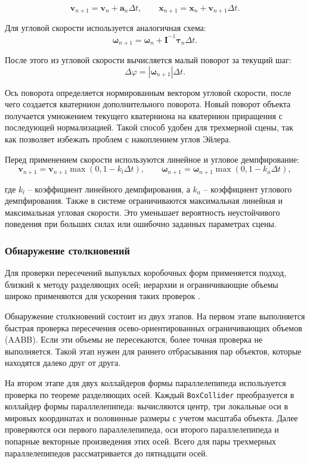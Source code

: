 \[
\mathbf{v}_{n+1}=\mathbf{v}_{n}+\mathbf{a}_{n}\Delta t,
\qquad
\mathbf{x}_{n+1}=\mathbf{x}_{n}+\mathbf{v}_{n+1}\Delta t.
\]

Для угловой скорости используется аналогичная схема:
\[
\boldsymbol{\omega}_{n+1}=\boldsymbol{\omega}_{n}+\mathbf{I}^{-1}\boldsymbol{\tau}_{n}\Delta t.
\]

После этого из угловой скорости вычисляется малый поворот за текущий шаг:
\[
\Delta \varphi = |\boldsymbol{\omega}_{n+1}|\Delta t.
\]

Ось поворота определяется нормированным вектором угловой скорости, после чего
создается кватернион дополнительного поворота. Новый поворот объекта получается
умножением текущего кватерниона на кватернион приращения с последующей
нормализацией. Такой способ удобен для трехмерной сцены, так как позволяет
избежать проблем с накоплением углов Эйлера.

Перед применением скорости используются линейное и угловое демпфирование:
\[
\mathbf{v}_{n+1}=\mathbf{v}_{n+1}\max(0,1-k_l\Delta t),
\qquad
\boldsymbol{\omega}_{n+1}=\boldsymbol{\omega}_{n+1}\max(0,1-k_a\Delta t),
\]

где \(k_l\) -- коэффициент линейного демпфирования, а \(k_a\) -- коэффициент
углового демпфирования. Также в системе ограничиваются максимальная линейная
и максимальная угловая скорости. Это уменьшает вероятность неустойчивого
поведения при больших силах или ошибочно заданных параметрах сцены.

\subsubsection{Обнаружение столкновений}

Для проверки пересечений выпуклых коробочных форм применяется подход, близкий
к методу разделяющих осей; иерархии и ограничивающие объемы широко применяются
для ускорения таких проверок \cite{gottschalk-obbtree}.

Обнаружение столкновений состоит из двух этапов. На первом этапе выполняется
быстрая проверка пересечения осево-ориентированных ограничивающих объемов
(AABB). Если эти объемы не пересекаются, более точная проверка не выполняется.
Такой этап нужен для раннего отбрасывания пар объектов, которые находятся далеко
друг от друга.

На втором этапе для двух коллайдеров формы параллелепипеда используется проверка
по теореме разделяющих осей. Каждый \texttt{BoxCollider} преобразуется в
коллайдер формы параллелепипеда: вычисляются центр, три
локальные оси в мировых координатах и половинные размеры с учетом масштаба
объекта. Далее проверяются оси первого параллелепипеда, оси второго
параллелепипеда и попарные векторные произведения этих осей. Всего для пары
трехмерных параллелепипедов рассматривается до пятнадцати осей.

